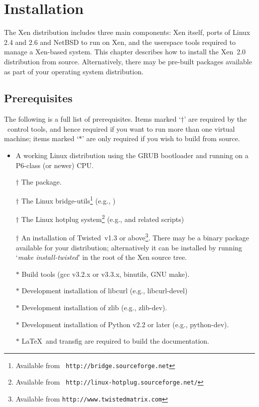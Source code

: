 \chapter{Installation}

The Xen distribution includes three main components: Xen itself, ports
of Linux 2.4 and 2.6 and NetBSD to run on Xen, and the userspace
tools required to manage a Xen-based system.  This chapter describes
how to install the Xen~2.0 distribution from source.  Alternatively,
there may be pre-built packages available as part of your operating
system distribution.


\section{Prerequisites}
\label{sec:prerequisites}

The following is a full list of prerequisites.  Items marked `$\dag$'
are required by the \xend\ control tools, and hence required if you
want to run more than one virtual machine; items marked `$*$' are only
required if you wish to build from source.
\begin{itemize}
\item A working Linux distribution using the GRUB bootloader and
  running on a P6-class (or newer) CPU.
\item [$\dag$] The  package.
\item [$\dag$] The Linux bridge-utils\footnote{Available from {\tt
      http://bridge.sourceforge.net}} (e.g., )
\item [$\dag$] The Linux hotplug system\footnote{Available from {\tt
      http://linux-hotplug.sourceforge.net/}} (e.g., 
      and related scripts)
\item [$\dag$] An installation of Twisted~v1.3 or
  above\footnote{Available from {\tt http://www.twistedmatrix.com}}.
  There may be a binary package available for your distribution;
  alternatively it can be installed by running `{\sl make
    install-twisted}' in the root of the Xen source tree.
\item [$*$] Build tools (gcc v3.2.x or v3.3.x, binutils, GNU make).
\item [$*$] Development installation of libcurl (e.g., libcurl-devel)
\item [$*$] Development installation of zlib (e.g., zlib-dev).
\item [$*$] Development installation of Python v2.2 or later (e.g.,
  python-dev).
\item [$*$] \LaTeX\ and transfig are required to build the
  documentation.
\end{itemize}

